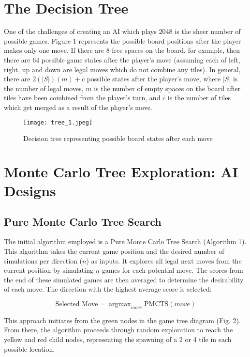 \documentclass{article}
\DeclareMathOperator*{\argmax}{argmax}
\begin{document}
\section{The Decision Tree}

One of the challenges of creating an AI which plays 2048 is the sheer number of possible games.  Figure 1 represents the possible board positions after the player makes only one move.  If there are 8 free spaces on the board, for example, then there are 64 possible game states after the player's move (assuming each of left, right, up and down are legal moves which do not combine any tiles).  In general, there are $2(|S|)(m) + c$ possible states after the player's move, where $|S|$ is the number of legal moves,  $m$ is the number of empty spaces on the board after tiles have been combined from the player's turn, and $c$ is the number of tiles which get merged as a result of the player's move.

\begin{figure}[H]
\centering
\texttt{[image: tree\_1.jpeg]}
\caption{Decision tree representing possible board states after each move}
\label{fig:tree1}
\end{figure}

\section{Monte Carlo Tree Exploration: AI Designs}
\subsection{Pure Monte Carlo Tree Search}
The initial algorithm employed is a Pure Monte Carlo Tree Search (Algorithm 1). This algorithm takes the current game position and the desired number of simulations per direction ($n$) as inputs. It explores all legal next moves from the current position by simulating $n$ games for each potential move. The scores from the end of these simulated games are then averaged to determine the desirability of each move. The direction with the highest average score is selected: 

\begin{equation}
\label{PMCTS_move_selection}
  \textrm{Selected Move} = \argmax_{move} \text{PMCTS}(move)
\end{equation}


This approach initiates from the green nodes in the game tree diagram (Fig. 2). From there, the algorithm proceeds through random exploration to reach the yellow and red child nodes, representing the spawning of a 2 or 4 tile in each possible location.
\end{document}
